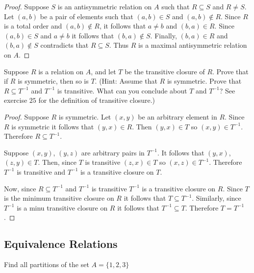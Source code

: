 \begin{proof}
    Suppose $S$ is an antisymmetric relation on $A$ such that 
        $R \subseteq S$ and $R \not = S$.
    Let $(a, b)$ be a pair of elements such that $(a, b) \in S$
        and $(a, b) \not \in R$.
    Since $R$ is a total order and $(a,b) \notin R$, it follows that $a \not = b$
        and $(b, a) \in R$.
    Since $(a, b) \in S$ and $a \not = b$ it follows that $(b, a) \not \in S$.
    Finally, $(b, a) \in R$ and $(b, a) \not \in S$ contradicts that $R \subseteq S$.
    Thus $R$ is a maximal antisymmetric relation on $A$.
\end{proof}

\begin{tcolorbox}[title=Problem 30, breakable]
    Suppose $R$ is a relation on $A$, and let $T$ be the transitive closure of $R$.
    Prove that if $R$ is symmetric, then so is $T$. (Hint: Assume that $R$ is symmetric.
    Prove that $R \subseteq T^{-1}$ and $T^{-1}$ is transitive. What can you conclude 
    about $T$ and $T^{-1}$? See exercise $25$ for the definition of transitive closure.)
\end{tcolorbox}

\begin{proof}
    Suppose $R$ is symmetric. Let $(x, y)$ be an arbitrary element in $R$.
    Since $R$ is symmetric it follows that $(y, x) \in R$.
    Then $(y, x) \in T$ so $(x, y) \in T^{-1}$.
    Therefore $R \subseteq T^{-1}$.

    Suppose $(x, y)$, $(y, z)$ are arbitrary pairs in $T^{-1}$.
    It follows that $(y, x)$, $(z, y) \in T$.
    Then, since $T$ is transitive $(z, x) \in T$ so $(x, z) \in T^{-1}$.
    Therefore $T^{-1}$ is transitive and $T^{-1}$ is a transitive
        closure on $T$.

    Now, since $R \subseteq T^{-1}$ and $T^{-1}$ is transitive $T^{-1}$ is
        a transitive closure on $R$.
    Since $T$ is the minimum transitive closure 
        on $R$ it follows that $T \subseteq T^{-1}$.
    Similarly, since $T^{-1}$ is a minu transitive closure 
        on $R$ it follows that $T^{-1} \subseteq T$.
    Therefore $T = T^{-1}$.
\end{proof}

\subsection{Equivalence Relations}

\begin{tcolorbox}[title=Problem 1, breakable]
    Find all partitions of the set $A = \{1, 2, 3\}$
\end{tcolorbox}

